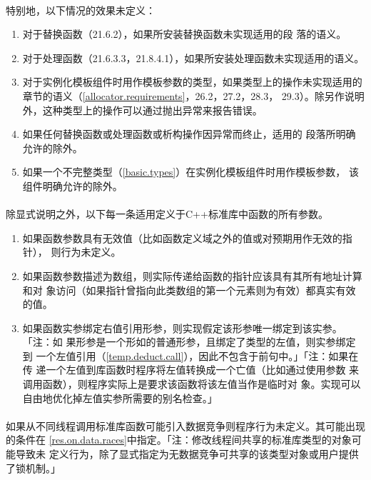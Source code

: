 \paragraph{}
特别地，以下情况的效果未定义：
\begin{enumerate}
  \item{对于替换函数（21.6.2），如果所安装替换函数未实现适用的段
    落的语义。}
  \item{对于处理函数（21.6.3.3，21.8.4.1），如果所安装处理函数未实现适用的语义。}
  \item{对于实例化模板组件时用作模板参数的类型，如果类型上的操作未实现适用的
    章节的语义（\ref{allocator.requirements}，26.2，27.2，28.3，
    29.3）。除另作说明外，这种类型上的操作可以通过抛出异常来报告错误。}
  \item{如果任何替换函数或处理函数或析构操作因异常而终止，适用的
    段落所明确允许的除外。}
  \item{如果一个不完整类型（\ref{basic.types}）在实例化模板组件时用作模板参数，
    该组件明确允许的除外。}
\end{enumerate}

\paragraph{}
除显式说明之外，以下每一条适用定义于C++标准库中函数的所有参数。
\begin{enumerate}
  \item{如果函数参数具有无效值（比如函数定义域之外的值或对预期用作无效的指针），
    则行为未定义。}
  \item{如果函数参数描述为数组，则实际传递给函数的指针应该具有其所有地址计算和对
    象访问（如果指针曾指向此类数组的第一个元素则为有效）都真实有效的值。}
  \item{如果函数实参绑定右值引用形参，则实现假定该形参唯一绑定到该实参。「注：如
    果形参是一个形如的普通形参，且绑定了类型的左值，则实参绑定到
    一个左值引用（\ref{temp.deduct.call}），因此不包含于前句中。」「注：如果在传
    递一个左值到库函数时程序将左值转换成一个亡值（比如通过使用参数
    来调用函数），则程序实际上是要求该函数将该左值当作是临时对
    象。实现可以自由地优化掉左值实参所需要的别名检查。」}
\end{enumerate}

\paragraph{}
如果从不同线程调用标准库函数可能引入数据竞争则程序行为未定义。其可能出现的条件在
\ref{res.on.data.races}中指定。「注：修改线程间共享的标准库类型的对象可能导致未
定义行为，除了显式指定为无数据竞争可共享的该类型对象或用户提供了锁机制。」

